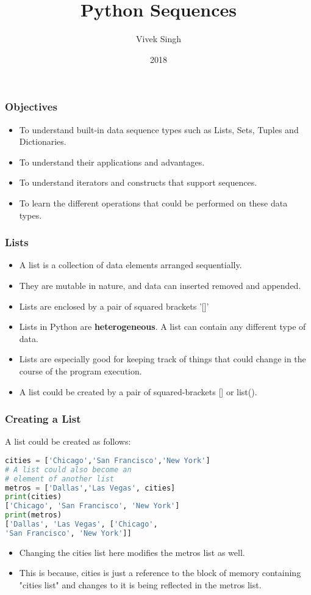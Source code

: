 \documentclass{beamer}
\title{Python Sequences}
\author{Vivek Singh}
\institute{Information Systems Decision Sciences (ISDS)\\
MUMA College of Business\\
University of South Florida \\
Tampa, Florida}
\date{2018}
\begin{document}
\frame{\titlepage}
\begin{frame}
\frametitle{Objectives}
\begin{itemize}
\item To understand built-in data sequence types such as Lists, Sets, Tuples and Dictionaries.
\item To understand their applications and advantages.
\item To understand iterators and constructs that support sequences.
\item To learn the different operations that could be performed on these data types.
\end{itemize}
\end{frame}
\begin{frame}
\frametitle{Lists}
\begin{itemize}
\item A list is a collection of data elements arranged sequentially.
\item They are mutable in nature, and data can inserted removed and appended.
\item Lists are enclosed by a pair of squared brackets '[]'
\item Lists in Python are \textbf{heterogeneous}. A list can contain any different type of data.
\item Lists are especially good for keeping track of things that could change in the course of the program execution.
\item A list could be created by a pair of squared-brackets [] or list().
\end{itemize}
\end{frame}


\begin{frame}[fragile]
\frametitle{Creating a List}
A list could be created as follows:
\begin{lstlisting}[language=Python]
cities = ['Chicago','San Francisco','New York']
# A list could also become an 
# element of another list 
metros = ['Dallas','Las Vegas', cities]
print(cities)
['Chicago', 'San Francisco', 'New York']
print(metros)
['Dallas', 'Las Vegas', ['Chicago', 
'San Francisco', 'New York']]
\end{lstlisting}
\begin{itemize}
\item Changing the cities list here modifies the  metros list as well.
\item This is because, cities is just a reference to the block of memory containing "cities list" and changes to it is being reflected in the metros list.
\end{itemize}
\end{frame}
\end{document}
